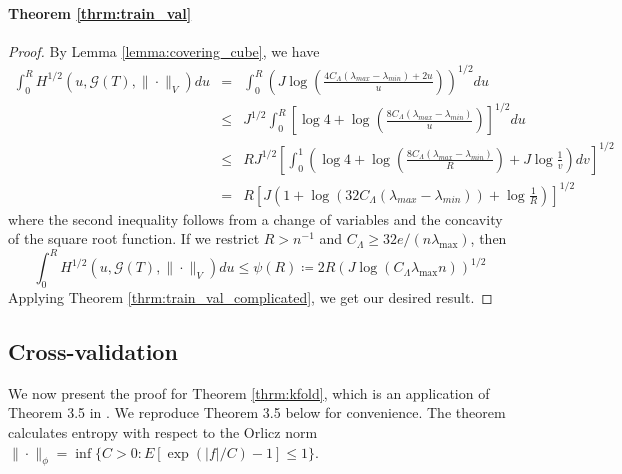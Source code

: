 \documentclass[12pt]{article}
\begin{document}
\paragraph{Theorem \ref{thrm:train_val}}
\begin{proof}
By Lemma \ref{lemma:covering_cube}, we have
\begin{eqnarray*}
	\int_{0}^{R}H^{1/2}(u,\mathcal{G}(T),\|\cdot\|_{V})du 
	&=& \int_{0}^{R} \left ( 
	J \log \left(\frac{4C_\Lambda\left(\lambda_{max}-\lambda_{min}\right)+2u}{u}\right)
	\right )^{1/2}
	du\\
	& \le & J^{1/2}\int_{0}^{R}\left[\log4+\log\left(\frac{8C_\Lambda\left(\lambda_{max}-\lambda_{min}\right)}{u}\right)\right]^{1/2}du\\
	& \le & RJ^{1/2}\left[\int_{0}^{1}\left(\log4+\log\left(\frac{8C_\Lambda\left(\lambda_{max}-\lambda_{min}\right)}{R}\right)+J\log\frac{1}{v}\right)dv\right]^{1/2}\\
	&=& 
	R\left[J \left (
	1+\log \left (32C_\Lambda\left(\lambda_{max}-\lambda_{min}\right)\right)
	+ \log\frac{1}{R} 
	\right )
	\right]^{1/2}
\end{eqnarray*}
where the second inequality follows from a change of variables and the concavity of the square root function. If we restrict $R > n^{-1}$ and $C_\Lambda \ge 32e/(n \lambda_{\max})$, then 
\begin{equation}
\label{eq:train_val_entropy}
\int_{0}^{R}H^{1/2}(u,\mathcal{G}(T),\|\cdot\|_{V})du
\le
\psi (R) \coloneqq 2 R\left ( J \log(C_\Lambda \lambda_{\max}n) \right )^{1/2}
\end{equation}
Applying Theorem \ref{thrm:train_val_complicated}, we get our desired result.
\end{proof}

\subsection{Cross-validation}
We now present the proof for Theorem \ref{thrm:kfold}, which is an application of Theorem 3.5 in \citet{lecue2012oracle}. We reproduce Theorem 3.5 below for convenience. The theorem calculates entropy with respect to the Orlicz norm $\| \cdot \|_{\phi} = \inf \{ C > 0: E[\exp(|f|/C) - 1] \le 1 \}$.
\end{document}
